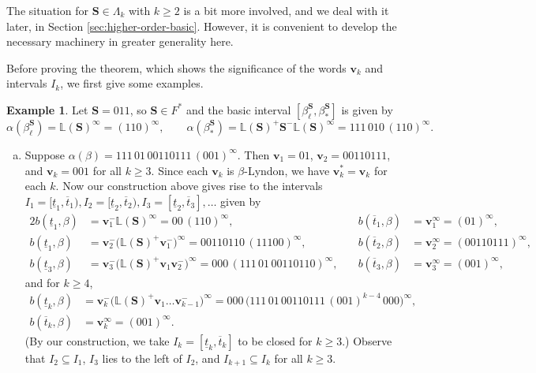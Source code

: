 \documentclass[11pt]{amsart}
\theoremstyle{definition}
\newtheorem{example}[theorem]{Example}
\theoremstyle{remark}
\numberwithin{equation}{section}
\renewcommand{\L}{\ensuremath{\mathbb{L}}}
\newcommand{\F}{F^*}
\newcommand{\cs}{ {\mathbf{S}}}
\renewcommand{\v}{\mathbf{v}}
\newcommand{\f}{\infty}
\newcommand{\al}{\alpha}
\newcommand{\La}{\Lambda}
\begin{document}
The situation for $\cs\in\La_k$ with $k\geq 2$ is a bit more involved, and we deal with it later, in Section \ref{sec:higher-order-basic}. However, it is convenient to develop the necessary machinery in greater generality here.

Before proving the theorem, which shows the significance of the words $\v_k$ and intervals $I_k$, we first give some examples.

\begin{example} \label{ex:v_k}
Let $\cs=011$, so $\cs\in\F$ and the basic interval $[\beta_\ell^{\cs},\beta_*^{\cs}]$ is given by
\[
\al(\beta_\ell^{\cs})=\L(\cs)^\f=(110)^\f, \qquad \al(\beta_*^{\cs})=\L(\cs)^+\cs^-\L(\cs)^\f=111\,010\,(110)^\f.
\]
\begin{enumerate}[(a)]
\item Suppose $\al(\beta)=111\,01\,00110111\,(001)^\f$. Then $\v_1=01$, $\v_2=00110111$, and $\v_k=001$ for all $k\geq 3$. Since each $\v_k$ is $\beta$-Lyndon, we have $\v_k^*=\v_k$ for each $k$. Now our construction above gives rise to the intervals $I_1=[\underline{t}_1,\overline{t}_1), I_2=[\underline{t}_2,\overline{t}_2), I_3=[\underline{t}_2,\overline{t}_3],\dots$ given by
\begin{alignat*}{2}
b(\underline{t}_1,\beta)&=\v_1^-\L(\cs)^\f=00\,(110)^\f, & \quad b(\overline{t}_1,\beta)&=\v_1^\f=(01)^\f,\\
b(\underline{t}_1,\beta)&=\v_2^-\big(\L(\cs)^+\v_1^-\big)^\f=00110110\,(11100)^\f, & \quad b(\overline{t}_2,\beta)&=\v_2^\f=(00110111)^\f,\\
b(\underline{t}_3,\beta)&=\v_3^-\big(\L(\cs)^+\v_1\v_2^-\big)^\f=000\,(111\,01\,00110110)^\f, & \quad b(\overline{t}_3,\beta)&=\v_3^\f=(001)^\f,
\end{alignat*}
and for $k\geq 4$,
\begin{align*}
b(\underline{t}_k,\beta)&=\v_k^-\big(\L(\cs)^+\v_1\dots\v_{k-1}^-\big)^\f=000\,\big(111\,01\,00110111\,(001)^{k-4}\,000\big)^\f,\\
b(\overline{t}_k,\beta)&=\v_k^\f=(001)^\f.
\end{align*}
{(By our construction, we take $I_k=[\underline{t}_k,\overline{t}_k]$ to be closed for $k\geq 3$.)}
Observe that $I_2\subseteq I_1$, $I_3$ lies to the left of $I_2$, and $I_{k+1}\subseteq I_k$ for all $k\geq 3$. 

\end{enumerate}
\end{example}
\end{document}
